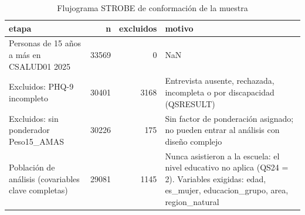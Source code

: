 \begin{table}[htbp]
\caption{Flujograma STROBE de conformación de la muestra}
\label{tab:tabla_04_flujograma_strobe}
\begin{tabular}{lrrl}
\toprule
etapa & n & excluidos & motivo \\
\midrule
Personas de 15 años a más en CSALUD01 2025 & 33569 & 0 & NaN \\
Excluidos: PHQ-9 incompleto & 30401 & 3168 & Entrevista ausente, rechazada, incompleta o por discapacidad (QSRESULT) \\
Excluidos: sin ponderador Peso15\_AMAS & 30226 & 175 & Sin factor de ponderación asignado; no pueden entrar al análisis con diseño complejo \\
Población de análisis (covariables clave completas) & 29081 & 1145 & Nunca asistieron a la escuela: el nivel educativo no aplica (QS24 = 2). Variables exigidas: edad, es\_mujer, educacion\_grupo, area, region\_natural \\
\bottomrule
\end{tabular}
\end{table}
